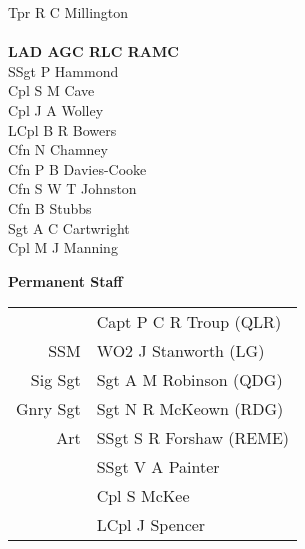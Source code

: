 \begin{multicols}{2}
  Tpr R C Millington \\
  \\
  \textbf{LAD AGC RLC RAMC} \\
  SSgt P Hammond \\
  Cpl S M Cave \\
  Cpl J A Wolley \\
  LCpl B R Bowers \\
  Cfn N Chamney \\
  Cfn P B Davies-Cooke \\
  Cfn S W T Johnston \\
  Cfn B Stubbs \\
  Sgt A C Cartwright \\
  Cpl M J Manning \\
\end{multicols}

\begin{center}
  \Large
  \textbf{Permanent Staff}
\end{center}

\begin{center}
  \begin{tabular}{rl}
    & Capt P C R Troup (QLR) \\
    SSM & WO2 J Stanworth (LG) \\
    Sig Sgt & Sgt A M Robinson (QDG) \\
    Gnry Sgt & Sgt N R McKeown (RDG) \\
    Art & SSgt S R Forshaw (REME) \\
    & SSgt V A Painter \\
    & Cpl S McKee \\
    & LCpl J Spencer \\
  \end{tabular}
\end{center}
